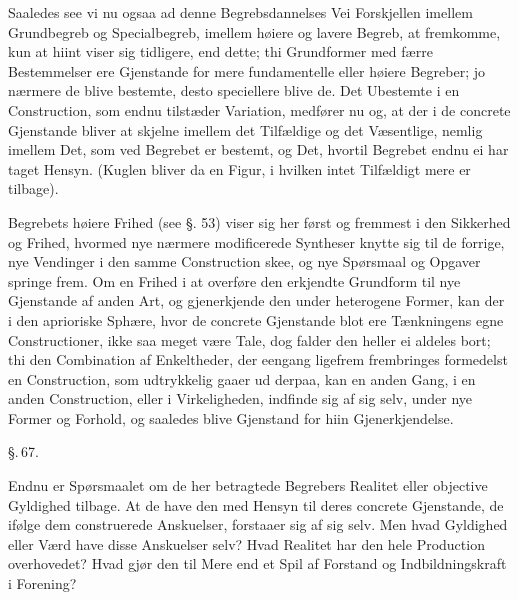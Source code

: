 \documentclass[12pt]{book}
\def\textit#1{#1}%
\newcommand{\parag}[1]{%
  \par\vspace{0.9\baselineskip}%
  {\centering\textit{\S.\,#1.}\par}%
  \vspace{0.35\baselineskip}%
  \noindent\hspace{\parindent}\ignorespaces
}
\newcommand{\opage}[1]{\marginnote{\footnotesize\textit{[#1]}}}
\begin{document}
Saaledes see vi nu ogsaa ad denne Begrebsdannelses Vei Forskjellen imellem
Grundbegreb og Specialbegreb, imellem høiere og lavere Begreb, at fremkomme,
kun at hiint viser sig tidligere, end dette; thi Grundformer med færre
Bestemmelser ere Gjenstande for mere fundamentelle eller høiere Begreber; jo
nærmere de blive bestemte, desto speciellere blive de. Det Ubestemte i en
Construction, som endnu tilstæder Variation, medfører nu og, at der i de
concrete Gjenstande bliver at skjelne imellem det Tilfældige og det
Væsentlige, nemlig imellem Det, som ved Begrebet er bestemt, og Det, hvortil
Begrebet endnu ei har taget Hensyn. (Kuglen bliver da en Figur, i hvilken intet
Tilfældigt mere er tilbage).

Begrebets høiere Frihed (see §. 53) viser sig her først og fremmest i den
Sikkerhed og Frihed, hvormed nye nærmere modificerede Syntheser knytte sig til
de forrige, nye Vendinger i den samme Construction skee, og nye Spørsmaal og
Opgaver springe frem. Om en Frihed i at overføre den erkjendte Grundform til
nye Gjenstande af anden Art, og gjenerkjende den under heterogene Former, kan
der i den aprioriske Sphære, hvor de concrete Gjenstande blot ere Tænkningens
egne Constructioner, ikke saa meget
\opage{178} være Tale, dog falder den heller ei aldeles bort; thi den Combination af
Enkeltheder, der eengang ligefrem frembringes formedelst en Construction, som
udtrykkelig gaaer ud derpaa, kan en anden Gang, i en anden Construction, eller
i Virkeligheden, indfinde sig af sig selv, under nye Former og Forhold, og
saaledes blive Gjenstand for hiin Gjenerkjendelse.

\parag{67}

Endnu er Spørsmaalet om de her betragtede Begrebers Realitet eller objective
Gyldighed tilbage. At de have den med Hensyn til deres concrete Gjenstande, de
ifølge dem construerede Anskuelser, forstaaer sig af sig selv. Men hvad
Gyldighed eller Værd have disse Anskuelser selv? Hvad Realitet har den hele
Production overhovedet? Hvad gjør den til Mere end et Spil af Forstand og
Indbildningskraft i Forening?
\end{document}
